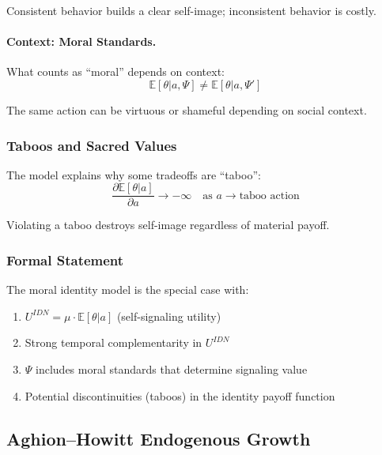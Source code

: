 Consistent behavior builds a clear self-image; inconsistent behavior is costly.

\paragraph{Context: Moral Standards.}
What counts as ``moral'' depends on context:
\begin{equation}
  \mathbb{E}[\theta | a, \Psi] \neq \mathbb{E}[\theta | a, \Psi']
\end{equation}

The same action can be virtuous or shameful depending on social context.

\subsubsection{Taboos and Sacred Values}

The model explains why some tradeoffs are ``taboo'':
\begin{equation}
  \frac{\partial \mathbb{E}[\theta | a]}{\partial a} \to -\infty
  \quad \text{as } a \to \text{taboo action}
\end{equation}

Violating a taboo destroys self-image regardless of material payoff.

\subsubsection{Formal Statement}

\begin{proposition}
The moral identity model is the special case with:
\begin{enumerate}
  \item $U^{IDN} = \mu \cdot \mathbb{E}[\theta | a]$ (self-signaling utility)
  \item Strong temporal complementarity in $U^{IDN}$
  \item $\Psi$ includes moral standards that determine signaling value
  \item Potential discontinuities (taboos) in the identity payoff function
\end{enumerate}
\end{proposition}

\subsection{Aghion--Howitt Endogenous Growth}
\label{app:aghionhowitt}

